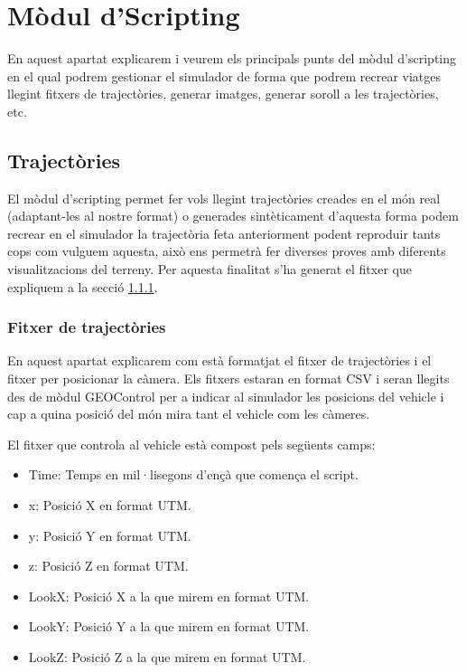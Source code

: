 \documentclass[10pt,a4paper,twocolumn,twoside]{article}
\begin{document}
\section{Mòdul d'Scripting}
\label{modulescript}
En aquest apartat explicarem i veurem els principals punts del mòdul d'scripting en el qual podrem gestionar el simulador de forma que podrem recrear viatges llegint fitxers de trajectòries, generar imatges, generar soroll a les trajectòries, etc.

\subsection{Trajectòries}
El mòdul d'scripting permet fer vols llegint trajectòries creades en el món real (adaptant-les al nostre format) o generades sintèticament d'aquesta forma podem recrear en el simulador la trajectòria feta anteriorment podent reproduir tants cops com vulguem aquesta, això ens permetrà fer diverses proves amb diferents visualitzacions del terreny. Per aquesta finalitat s'ha generat el fitxer que expliquem a la secció \ref{file-trajectories}.

\subsubsection{Fitxer de trajectòries}
\label{file-trajectories}
En aquest apartat explicarem com està formatjat el fitxer de trajectòries i el fitxer per posicionar la càmera. Els fitxers estaran en format CSV i seran llegits des de mòdul GEOControl per a indicar al simulador les posicions del vehicle i cap a quina posició del món mira tant el vehicle com les càmeres.

El fitxer que controla al vehicle està compost pels següents camps:

\begin{itemize}
\item Time: Temps en mil·lisegons d'ençà que comença el script.
\item x: Posició X en format UTM.
\item y: Posició Y en format UTM.
\item z: Posició Z en format UTM.
\item LookX: Posició X a la que mirem en format UTM.
\item LookY: Posició Y a la que mirem en format UTM.
\item LookZ: Posició Z a la que mirem en format UTM.
\end{itemize}
\end{document}
